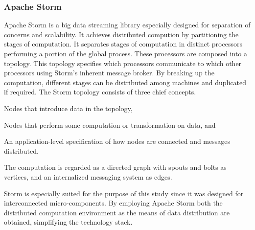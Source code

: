 \subsubsection*{Apache Storm}
Apache Storm is a big data streaming library especially designed for separation of concerns and scalability. It achieves distributed compution by partitioning the stages of computation. It separates stages of computation in distinct processors performing a portion of the global process. These processors are composed into a topology. This topology specifies which processors communicate to which other processors using Storm's inherent message broker. By breaking up the computation, different stages can be distributed among machines and duplicated if required. The Storm topology consists of three chief concepts.
\begin{description}[style=nextline]
\nospace
\item[Spouts] Nodes that introduce data in the topology,
\item[Bolts] Nodes that perform some computation or transformation on data, and
\item[Topology] An application-level specification of how nodes are connected and messages distributed.
\end{description}
The computation is regarded as a directed graph with spouts and bolts as vertices, and an internalized messaging system as edges.


Storm is especially suited for the purpose of this study since it was designed for interconnected micro-components. By employing Apache Storm both the distributed computation environment as the means of data distribution are obtained, simplifying the technology stack.

